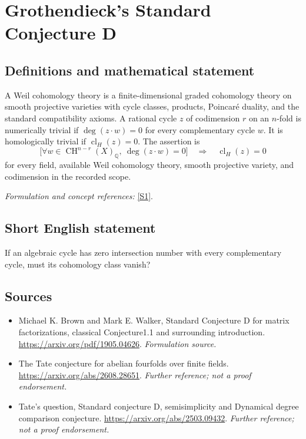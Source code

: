 \documentclass[11pt]{article}
\begin{document}
\section*{\texorpdfstring{Grothendieck's Standard Conjecture D}{Grothendieck's Standard Conjecture D}}\label{30006693}
\subsection{Definitions and mathematical statement}
A Weil cohomology theory is a finite-dimensional graded cohomology theory on smooth projective varieties with cycle classes, products, Poincaré duality, and the standard compatibility axioms. A rational cycle $z$ of codimension $r$ on an $n$-fold is numerically trivial if $\deg(z\cdot w)=0$ for every complementary cycle $w$. It is homologically trivial if $\operatorname{cl}_H(z)=0$. The assertion is
\[
 \bigl[\forall w\in\operatorname{CH}^{n-r}(X)_{{\mathbb{Q}}},\ \deg(z\cdot w)=0\bigr]
 \quad\Longrightarrow\quad \operatorname{cl}_H(z)=0
\]
for every field, available Weil cohomology theory, smooth projective variety, and codimension in the recorded scope.
\par\smallskip\textit{Formulation and concept references:} \href{https://arxiv.org/pdf/1905.04626}{[S1]}.

\subsection{Short English statement}
If an algebraic cycle has zero intersection number with every complementary cycle, must its cohomology class vanish?
\subsection{Sources}
\begin{itemize}
\item[S1]Michael K. Brown and Mark E. Walker, Standard Conjecture D for matrix factorizations, classical Conjecture1.1 and surrounding introduction.
\url{https://arxiv.org/pdf/1905.04626}.
\textit{Formulation source.}
\item[S2]The Tate conjecture for abelian fourfolds over finite fields.
\url{https://arxiv.org/abs/2608.28651}.
\textit{Further reference; not a proof endorsement.}
\item[S3]Tate's question, Standard conjecture D, semisimplicity and Dynamical degree comparison conjecture.
\url{https://arxiv.org/abs/2503.09432}.
\textit{Further reference; not a proof endorsement.}
\end{itemize}
\end{document}
